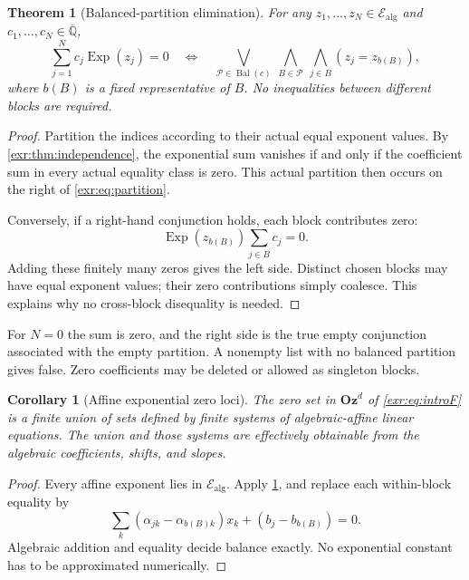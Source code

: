 \documentclass[11pt,letterpaper]{article}
\numberwithin{equation}{section}
\newtheorem{theorem}{Theorem}[section]
\newtheorem{corollary}[corollary]{Corollary}
\theoremstyle{definition}
\theoremstyle{remark}
\newcommand{\Oz}{\mathbf{Oz}}
\newcommand{\Qb}{\overline{\mathbb Q}}
\newcommand{\Ealg}{\mathcal E_{\mathrm{alg}}}
\newcommand{\Exp}{\operatorname{Exp}}
\newcommand{\bal}{\operatorname{Bal}}
\begin{document}
\begin{theorem}[Balanced-partition elimination]\label{exr:thm:partition}
For any $z_1,\ldots,z_N\in\Ealg$ and $c_1,\ldots,c_N\in\Qb$,
\begin{equation}\label{exr:eq:partition}
 \sum_{j=1}^{N}c_j\Exp(z_j)=0
 \quad\Longleftrightarrow\quad
 \bigvee_{\mathcal P\in\bal(c)}
 \ \bigwedge_{B\in\mathcal P}\ \bigwedge_{j\in B}(z_j=z_{b(B)}),
\end{equation}
where $b(B)$ is a fixed representative of $B$. No inequalities between different
blocks are required.
\end{theorem}
\begin{proof}
Partition the indices according to their actual equal exponent values. By
\cref{exr:thm:independence}, the exponential sum vanishes if and only if the
coefficient sum in every actual equality class is zero. This actual partition
then occurs on the right of \eqref{exr:eq:partition}.

Conversely, if a right-hand conjunction holds, each block contributes zero:
\[\Exp(z_{b(B)})\sum_{j\in B}c_j=0.\]
Adding these finitely many zeros gives the
left side. Distinct chosen blocks may have equal exponent values; their zero
contributions simply coalesce. This explains why no cross-block disequality is
needed.
\end{proof}

For $N=0$ the sum is zero, and the right side is the true empty conjunction
associated with the empty partition. A nonempty list with no balanced partition
gives false. Zero coefficients may be deleted or allowed as singleton blocks.

\begin{corollary}[Affine exponential zero loci]\label{exr:cor:affine}
The zero set in $\Oz^d$ of \eqref{exr:eq:introF} is a finite union of sets defined by
finite systems of algebraic-affine linear equations. The union and those systems
are effectively obtainable from the algebraic coefficients, shifts, and slopes.
\end{corollary}
\begin{proof}
Every affine exponent lies in $\Ealg$. Apply \cref{exr:thm:partition}, and replace each
within-block equality by
\begin{equation}\label{exr:eq:lineareq}
 \sum_k(\alpha_{jk}-\alpha_{b(B)k})x_k+(b_j-b_{b(B)})=0.
\end{equation}
Algebraic addition and equality decide balance exactly. No exponential constant
has to be approximated numerically.
\end{proof}
\end{document}
